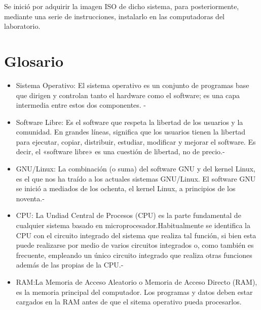 \documentclass[
  letterpaper, 
  maincolor=black,
  sectioncolor=black!90,
  subsectioncolor=black!70,
  itemtextcolor=black!40,
]{fortysecondscv}
\begin{document}
{\Large 
Se inició por adquirir la imagen ISO de dicho sistema, para posteriormente, mediante una serie de instrucciones, instalarlo en las computadoras del laboratorio.}
 
\newpage
\section{Glosario}
\renewcommand{\baselinestretch}{2}

\begin{itemize}
\item {\Large Sistema Operativo: El sistema operativo es un conjunto de programas base que dirigen y controlan tanto el hardware como el software; es una capa intermedia entre estos dos componentes. -\cite{silva2008debian}}

\item {\Large Software Libre: Es el software que respeta la libertad de los usuarios y la comunidad. En grandes líneas, significa que los usuarios tienen la libertad para ejecutar, copiar, distribuir, estudiar, modificar y mejorar el software. Es decir, el «software libre» es una cuestión de libertad, no de precio.-\cite{badillo2015estudio}}

\item {\Large GNU/Linux: La combinación (o suma) del software GNU y del kernel Linux, es el que nos ha traído a los actuales sistemas GNU/Linux. El software GNU se inició a mediados de los ochenta, el
kernel Linux, a principios de los noventa.-\cite{jorba2004administracion}}

\item {\Large CPU: La Undiad Central de Procesos (CPU) es la parte fundamental de cualquier sistema basado en microprocesador.Habitualmente se identifica la CPU con el circuito integrado del sistema que realiza tal función, si bien esta puede realizarse por medio de varios circuitos integrados o, como también es frecuente, empleando un único circuito integrado que realiza otras funciones además de las propias de la CPU.-\cite{sanchis2002sistemas}}

\item {\Large RAM:La Memoria de Acceso Aleatorio o Memoria de Acceso Directo (RAM), es la memoria principal del computador. Los programas y datos deben estar cargados en la RAM antes de que el sitema operativo pueda procesarlos.\cite{silva2008debian}}





\end{itemize}
\end{document}
